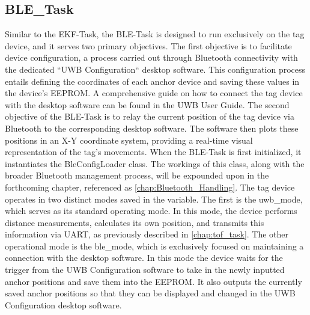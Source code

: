 \subsection{BLE\_Task}
\label{sec:Ble_Task}
Similar to the EKF-Task, the BLE-Task is designed to run exclusively on the tag device, and it serves two primary objectives.
\vspace{4pt}
\newline
The first objective is to facilitate device configuration, a process carried out through Bluetooth connectivity with the dedicated ``UWB Configuration`` desktop software. This configuration process entails defining the coordinates of each anchor device and saving these values in the device's EEPROM. A comprehensive guide on how to connect the tag device with the desktop software can be found in the UWB User Guide.
\vspace{4pt}
\newline
The second objective of the BLE-Task is to relay the current position of the tag device via Bluetooth to the corresponding desktop software. The software then plots these positions in an X-Y coordinate system, providing a real-time visual representation of the tag's movements.
\vspace{4pt}
\newline
When the BLE-Task is first initialized, it instantiates the BleConfigLoader class. The workings of this class, along with the broader Bluetooth management process, will be expounded upon in the forthcoming chapter, referenced as \ref{chap:Bluetooth_Handling}.
\vspace{4pt}
\newline
The tag device operates in two distinct modes saved in the  variable. The first is the uwb\_mode, which serves as its standard operating mode. In this mode, the device performs distance measurements, calculates its own position, and transmits this information via UART, as previously described in \ref{chap:tof_task}.
\vspace{4pt}
\newline
The other operational mode is the ble\_mode, which is exclusively focused on maintaining a connection with the desktop software. 
In this mode the device waits for the trigger from the UWB Configuration software to take in the newly inputted anchor positions and save them into the EEPROM. 
It also outputs the currently saved anchor positions so that they can be displayed and changed in the UWB Configuration desktop software. 

